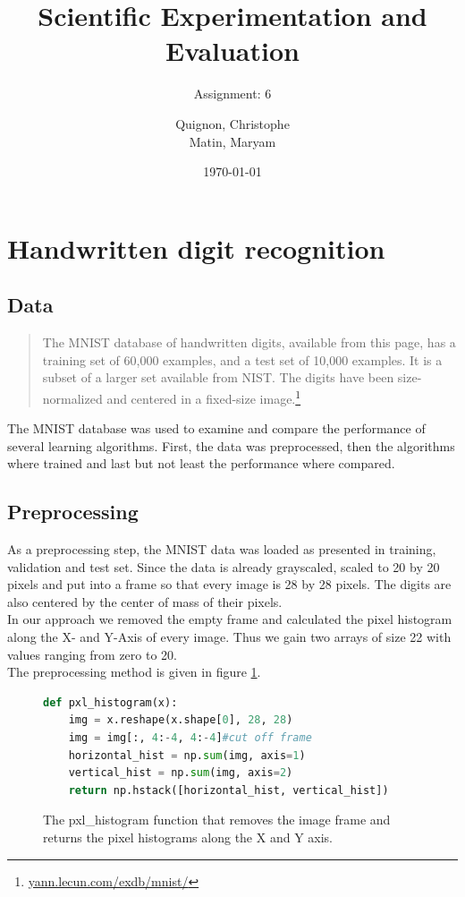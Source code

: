\documentclass{scrartcl}
\begin{document}
\title{Scientific Experimentation and Evaluation
}
\subtitle{
Assignment: 6}
\author{
  Quignon, Christophe\\
  Matin, Maryam
}
\date{\today}


\maketitle


\section{Handwritten digit recognition}
\subsection{Data}
\begin{quote}
The MNIST database of handwritten digits, available from this page, has a training set of 60,000 examples, and a test set of 10,000 examples. It is a subset of a larger set available from NIST. The digits have been size-normalized and centered in a fixed-size image.\footnote{\href{http://yann.lecun.com/exdb/mnist/}{yann.lecun.com/exdb/mnist/}}
\end{quote}
The MNIST database was used to examine and compare the performance of several learning algorithms. First, the data was preprocessed, then the algorithms where trained and last but not least the performance where compared.

\subsection{Preprocessing}
\label{sec:Preprocessing}
As a preprocessing step, the MNIST data was loaded as presented in training, validation and test set. Since the data is already grayscaled, scaled to 20 by 20 pixels and put into a frame so that every image is 28 by 28 pixels. The digits are also centered by the center of mass of their pixels.\\
In our approach we removed the empty frame and calculated the pixel histogram along the X- and Y-Axis of every image. Thus we gain two arrays of size 22 with values ranging from zero to 20.\\
The preprocessing method is given in figure \ref{fig:preprocess}.

\begin{figure}[H]
 \center
\begin{lstlisting}[language=Python]
def pxl_histogram(x):
    img = x.reshape(x.shape[0], 28, 28)
    img = img[:, 4:-4, 4:-4]#cut off frame
    horizontal_hist = np.sum(img, axis=1)
    vertical_hist = np.sum(img, axis=2)
    return np.hstack([horizontal_hist, vertical_hist])
\end{lstlisting}
 \caption{The pxl\_histogram function that removes the image frame and returns the pixel histograms along the X and Y axis.}
 \label{fig:preprocess}
\end{figure}
\end{document}
